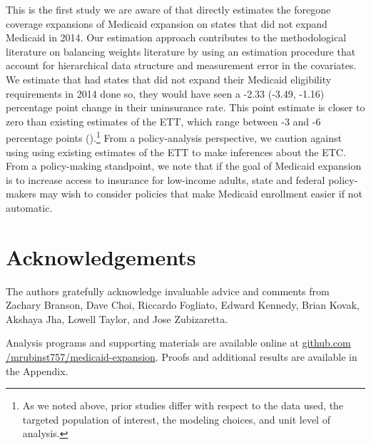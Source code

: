 \documentclass[aoas]{imsart}
\theoremstyle{plain}
\theoremstyle{remark}
\begin{document}
This is the first study we are aware of that directly estimates the foregone coverage expansions of Medicaid expansion on states that did not expand Medicaid in 2014. Our estimation approach contributes to the methodological literature on balancing weights literature by using an estimation procedure that account for hierarchical data structure and measurement error in the covariates. We estimate that had states that did not expand their Medicaid eligibility requirements in 2014 done so, they would have seen a -2.33 (-3.49, -1.16) percentage point change in their uninsurance rate. This point estimate is closer to zero than existing estimates of the ETT, which range between -3 and -6 percentage points (\cite{frean2017premium}).\footnote{As we noted above, prior studies differ with respect to the data used, the targeted population of interest, the modeling choices, and unit level of analysis.} From a policy-analysis perspective, we caution against using using existing estimates of the ETT to make inferences about the ETC. From a policy-making standpoint, we note that if the goal of Medicaid expansion is to increase access to insurance for low-income adults, state and federal policy-makers may wish to consider policies that make Medicaid enrollment easier if not automatic.

\section*{Acknowledgements}

The authors gratefully acknowledge invaluable advice and comments from Zachary Branson, Dave Choi, Riccardo Fogliato, Edward Kennedy, Brian Kovak, Akshaya Jha, Lowell Taylor, and Jose Zubizaretta.

\begin{supplement}
Analysis programs and supporting materials are available online at \url{github.com /mrubinst757/medicaid-expansion}. Proofs and additional results are available in the Appendix.
\end{supplement}


\clearpage

\appendix










%


\end{document}
